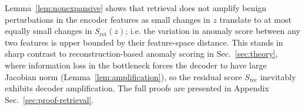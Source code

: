 \documentclass{article}
\theoremstyle{plain}
\theoremstyle{definition}
\theoremstyle{remark}
\begin{document}
Lemma~\ref{lem:nonexpansive} shows that retrieval does not amplify benign perturbations in the encoder features as small changes in $z$ translate to at most equally small changes in $S_{\mathrm{ret}}(z)$; i.e. the variation in anomaly score between any two features is upper bounded by their feature-space distance.
This stands in sharp contrast to reconstruction-based anomaly scoring in
Sec.~\ref{sec:theory}, where information loss in the bottleneck forces the
decoder to have large Jacobian norm (Lemma~\ref{lem:amplification}), so the
residual score $S_{\mathrm{rec}}$ inevitably exhibits decoder amplification. The full proofs are presented in Appendix Sec.~\ref{sec:proof-retrieval}.






\end{document}
